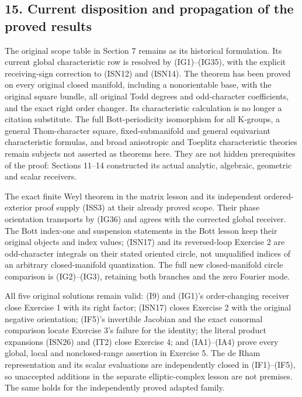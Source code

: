 \documentclass[
  11pt,
]{article}
\begin{document}
\subsection{15. Current disposition and propagation of the proved
results}\label{current-disposition-and-propagation-of-the-proved-results}

The original scope table in Section 7 remains as its historical
formulation. Its current global characteristic row is resolved by
(IG1)--(IG35), with the explicit receiving-sign correction to (ISN12)
and (ISN14). The theorem has been proved on every original closed
manifold, including a nonorientable base, with the original square
bundle, all original Todd degrees and odd-character coefficients, and
the exact right order changer. Its characteristic calculation is no
longer a citation substitute. The full Bott-periodicity isomorphism for
all K-groups, a general Thom-character square, fixed-submanifold and
general equivariant characteristic formulas, and broad anisotropic and
Toeplitz characteristic theories remain subjects not asserted as
theorems here. They are not hidden prerequisites of the proof: Sections
11--14 constructed its actual analytic, algebraic, geometric and scalar
receivers.

The exact finite Weyl theorem in the matrix lesson and its independent
ordered-exterior proof supply (ISS3) at their already proved scope.
Their phase orientation transports by (IG36) and agrees with the
corrected global receiver. The Bott index-one and suspension statements
in the Bott lesson keep their original objects and index values; (ISN17)
and its reversed-loop Exercise 2 are odd-character integrals on their
stated oriented circle, not unqualified indices of an arbitrary
closed-manifold quantization. The full new closed-manifold circle
comparison is (IG2)--(IG3), retaining both branches and the zero Fourier
mode.

All five original solutions remain valid: (I9) and (IG1)'s
order-changing receiver close Exercise 1 with its right factor; (ISN17)
closes Exercise 2 with the original negative orientation; (IF5)'s
invertible Jacobian and the exact conormal comparison locate Exercise
3's failure for the identity; the literal product expansions (ISN26) and
(IT2) close Exercise 4; and (IA1)--(IA4) prove every global, local and
nonclosed-range assertion in Exercise 5. The de Rham representation and
its scalar evaluations are independently closed in (IF1)--(IF5), so
unaccepted additions in the separate elliptic-complex lesson are not
premises. The same holds for the independently proved adapted family.
\end{document}
